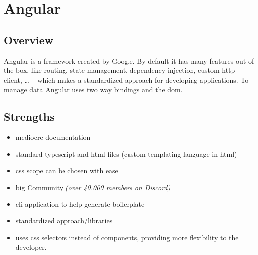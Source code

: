
\section{Angular}
\label{sec:angular}

\subsection{Overview}
\label{subsec:angular:overview}

Angular is a \gls{framework} created by Google. By default it has many features out of the box, like routing, state management, dependency injection, custom \acrshort{http} client, \dots\ - which makes a standardized approach for developing applications. To manage data Angular uses two way bindings and the \acrshort{dom}.


\subsection{Strengths}
\label{subsec:angular:strengths}
\begin{itemize}
    \item mediocre documentation
    \item standard typescript and \acrshort{html} files (custom templating language in \acrshort{html})
    \item \acrshort{css} scope can be chosen with ease
    \item big Community \textit{(over 40,000 members on Discord)}
    \item \acrshort{cli} application to help generate boilerplate
    \item standardized approach/libraries
    \item uses \acrshort{css} selectors instead of components, providing more flexibility to the developer.
\end{itemize}

